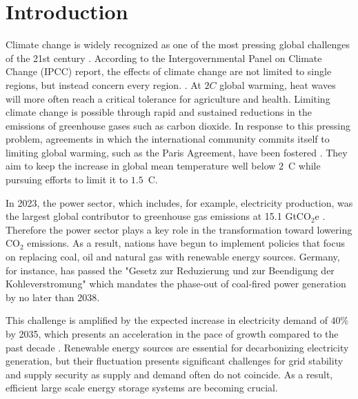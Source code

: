 \chapter{Introduction}
\label{ch:Introduction}
Climate change is widely recognized as one of the most pressing global challenges of the 21st century \cite{climateChangeHealth}. %
According to the Intergovernmental Panel on Climate Change (IPCC) report, 
the effects of climate change are not limited to single regions, but instead concern every region. \cite{IntergovernmentalPanelonClimateChange}.
At $2$\textdegree $C$ global warming, heat waves will more often reach a critical tolerance for agriculture and health.
Limiting climate change is possible through rapid and sustained reductions in the emissions of greenhouse gases such as carbon dioxide.
In response to this pressing problem, agreements in which the international community commits itself to limiting global warming, such as the Paris Agreement, have been fostered \cite{paris}. They aim to keep the increase in global mean temperature well below $2$~\textdegree C while pursuing efforts to limit it to $1.5$~\textdegree C.

In 2023, the power sector, which includes, for example, electricity production, was the largest global contributor to greenhouse gas emissions at 15.1 GtCO$_2$e \cite{emmisionDueToPowerGeneration}.
Therefore the power sector plays a key role in the transformation toward lowering CO$_2$ emissions.
As a result, nations have begun to implement policies that focus on replacing coal, oil and natural gas with renewable energy sources.
Germany, for instance, has passed the "Gesetz zur Reduzierung und zur Beendigung der Kohleverstromung" which mandates the phase-out of coal-fired power generation by no later than 2038.

This challenge is amplified by the expected increase in electricity demand of $40\%$ by 2035, which presents an acceleration in the pace of growth compared to the past decade \cite{energyDemand}.
Renewable energy sources are essential for decarbonizing electricity generation, but their fluctuation presents significant challenges for grid stability and supply security as supply and demand often do not coincide.
As a result, efficient large scale energy storage systems are becoming crucial.

